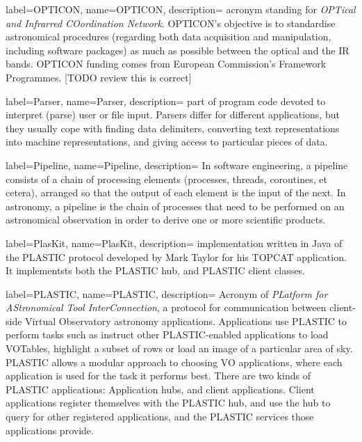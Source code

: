 {
    label={OPTICON},
    name={OPTICON},
    description={
    	acronym standing for \emph{OPTical and Infrarred COordination
        Network}. OPTICON's objective is to standardise astronomical
        procedures (regarding both data acquisition and manipulation,
        including software packages) as much as possible between the
        \gls{optical} and the \gls{IR} bands. OPTICON funding comes
        from European Commission's Framework Programmes. [TODO review
        this is correct]
    }
}

{
    label={Parser},
    name={Parser},
    description={
    	part of program code devoted to interpret (parse) user or file
        input. Parsers differ for different applications, but they
        usually cope with finding data delimiters, converting text
        representations into machine representations, and giving access
        to particular pieces of data.
    }
}

{
    label={Pipeline},
    name={Pipeline},
    description={
    	In software engineering, a pipeline consists of a chain of
        processing elements (processes, threads, coroutines, et cetera),
        arranged so that the output of each element is the input of the
        next. In astronomy, a pipeline is the chain of processes that
        need to be performed on an astronomical observation in order to
        derive one or more scientific products.
    }
}

{
    label={PlasKit},
    name={PlasKit},
    description={
    	implementation written in \gls{Java} of the \gls{PLASTIC}
        protocol developed by Mark Taylor for his \gls{TOPCAT}
        application. It implementsts both the PLASTIC hub, and PLASTIC
        client classes.
    }
}

{
    label={PLASTIC},
    name={PLASTIC},
    description={
    	Acronym of \emph{PLatform for AStronomical Tool
        InterConnection}, a protocol for communication between
        client-side \gls{Virtual Observatory} astronomy applications.
        Applications use PLASTIC to perform tasks such as instruct
        other PLASTIC-enabled applications to load \gls{VOTables},
        highlight a subset of rows or load an image of a particular
        area of sky. PLASTIC allows a modular approach to choosing VO
        applications, where each application is used for the task it
        performs best. There are two kinds of PLASTIC applications:
        Application hubs, and client applications. Client applications
        register themselves with the PLASTIC hub, and use the hub to
        query for other registered applications, and the PLASTIC
        services those applications provide.
    }
}

